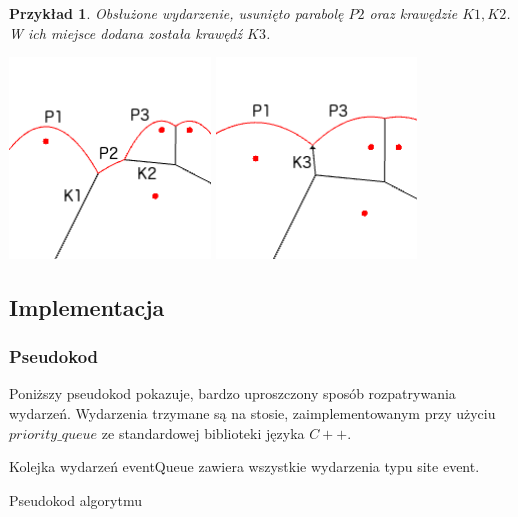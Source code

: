 \documentclass[declaration,shortabstract, inz]{iithesis}
\theoremstyle{definition} \newtheorem{definition}{Definicja}[]
\theoremstyle{plain} \newtheorem{remark}[definition]{Obserwacja}
\theoremstyle{plain} \newtheorem{theorem}[definition]{Twierdzenie}
\theoremstyle{plain} \newtheorem{example}{Przykład}[definition]
\theoremstyle{plain} \newtheorem{lemma}[definition]{Lemat}
\begin{document}
 \begin{example}
	Obsłużone wydarzenie, usunięto parabolę $P2$ oraz krawędzie $K1, K2$. W ich miejsce dodana została krawędź $K3$.
	
	\begin{center}
		\includegraphics[width=0.4\textwidth]{ExampleCircleEvent1}
		\qquad
		\includegraphics[width=0.4\textwidth]{ExampleCircleEvent2}
	\end{center}
\end{example}

\subsection{Implementacja}

\subsubsection{Pseudokod}
Poniższy pseudokod pokazuje, bardzo uproszczony sposób rozpatrywania wydarzeń. Wydarzenia trzymane są na stosie, zaimplementowanym przy użyciu $priority\_queue$ ze standardowej biblioteki języka $C++$.

\begin{algorithm}[H]
\SetAlgoLined
	Kolejka wydarzeń eventQueue zawiera wszystkie wydarzenia typu site event.\\
 \caption{Pseudokod algorytmu}
\end{algorithm}
\end{document}
